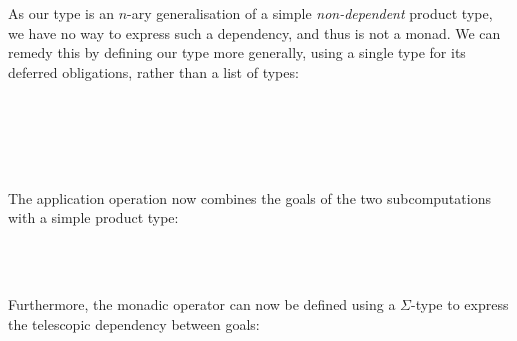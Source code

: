\documentclass[sigplan]{acmart}%
\begin{document}
 As our  type is an $n$-ary generalisation of a simple \emph{non-dependent} 
 product type, we have no way to express such a dependency, and thus 
 is not a monad. We can remedy this by defining our  type more generally, using a single type for its deferred obligations, rather 
 than a list of types:
\begin{code}
\>[2]\AgdaSpace{}%
\AgdaSpace{}%
\AgdaSymbol{(}\AgdaSpace{}%
\AgdaSymbol{:}\AgdaSpace{}%
\AgdaSpace{}%
\AgdaSymbol{)}\AgdaSpace{}%
\AgdaSymbol{:}\AgdaSpace{}%
\AgdaSpace{}%
\AgdaSymbol{(}\AgdaSpace{}%
\AgdaSymbol{)}\AgdaSpace{}%
\<%
\\
\>[2][@{}l@{\AgdaIndent{0}}]%
\>[5]\AgdaSpace{}%
\<%
\\
%
\>[5]\<%
\\
\>[5][@{}l@{\AgdaIndent{0}}]%
\>[7]\AgdaSpace{}%
\AgdaSymbol{:}\AgdaSpace{}%
\<%
\\
%
\>[7]\AgdaSpace{}%
\AgdaSymbol{:}\AgdaSpace{}%
\AgdaSpace{}%
\AgdaSpace{}%
\<%
\end{code}
The application operation now combines the goals of the two subcomputations with a simple product type:

\begin{code}
\>[2]\AgdaOperator{\AgdaFunction{\AgdaUnderscore{}\ensuremath{\circledast}\AgdaUnderscore{}}}\AgdaSpace{}%
\AgdaSymbol{:}%
\>[11]\AgdaSpace{}%
\AgdaSymbol{(}\AgdaSpace{}%
\AgdaSpace{}%
\AgdaSymbol{)}\AgdaSpace{}%
\AgdaSpace{}%
\AgdaSpace{}%
\AgdaSpace{}%
\AgdaSpace{}%
\AgdaSpace{}%
\<%
\\
%
\>[2]\AgdaSpace{}%
\AgdaOperator{\AgdaFunction{\ensuremath{\circledast}}}\AgdaSpace{}%
\AgdaSpace{}%
\AgdaSymbol{=}%
\>[51I]\AgdaSpace{}%
\AgdaSymbol{(}\AgdaSpace{}%
\AgdaSpace{}%
\AgdaSpace{}%
\AgdaSpace{}%
\AgdaSymbol{)}\<%
\\
\>[51I][@{}l@{\AgdaIndent{0}}]%
\>[16]\AgdaSpace{}%
\AgdaSymbol{\{}\AgdaSpace{}%
\AgdaSymbol{(}\AgdaSpace{}%
\AgdaOperator{\AgdaInductiveConstructor{,}}\AgdaSpace{}%
\AgdaSpace{}%
\AgdaSymbol{)}\AgdaSpace{}%
\AgdaSpace{}%
\AgdaSpace{}%
\AgdaSpace{}%
\AgdaSpace{}%
\AgdaSymbol{(}\AgdaSpace{}%
\AgdaSpace{}%
\AgdaSymbol{)}\AgdaSpace{}%
\AgdaSymbol{\}}\<%
\end{code}
 Furthermore, the monadic  operator can now be defined using a $\Sigma$-type to express the telescopic dependency between goals:
\end{document}
